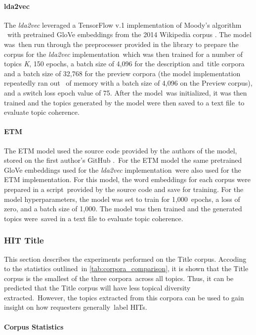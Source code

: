 \documentclass[letterpaper,12pt]{article}
\begin{document}
\paragraph{lda2vec}
The \emph{lda2vec} leveraged a TensorFlow v.1 implementation \cite{lda2vecTF} of Moody's algorithm \
with pretrained GloVe embeddings from the 2014 Wikipedia corpus \cite{pennington2014glove}. The model was\
then run through the preprocesser provided in the library to prepare the corpus for the \emph{lda2vec} implementation\
which was then trained for a number of topics \emph{K}, 150 epochs, a batch size of 4,096 for the description and\
title corpora and a batch size of 32,768 for the preview corpora (the model implementation repeatedly ran out \
of memory with a batch size of 4,096 on the Preview corpus), and a switch loss epoch value of 75. After the model\
was initialized, it was then trained and the topics generated by the model were then saved to a text file\
to evaluate topic coherence.

\paragraph{ETM}
The ETM model used the source code provided by the authors of the model, stored on the first author's GitHub \cite{etmGithub}.\
For the ETM model the same pretrained GloVe embeddings \cite{pennington2014glove} used for the \emph{lda2vec} implementation\
were also used for the ETM implementation. For this model, the word embeddings for each corpus were prepared in a script\
provided by the source code and save for training. For the model hyperparameters, the model was set to train for 1,000\
epochs, a loss of zero, and a batch size of 1,000. The model was then trained and the generated topics were\
saved in a text file to evaluate topic coherence.

\subsubsection{HIT Title}
This section describes the experiments performed on the Title corpus. Accoding to the statistics outlined\
in \ref{tab:corpora_comparison}, it is shown that the Title corpus is the smallest of the three corpora\
across all topics. Thus, it can be predicted that the Title corpus will have less topical diversity extracted.\
However, the topics extracted from this corpora can be used to gain insight on how requesters generally\
label HITs.
\paragraph{Corpus Statistics}
\end{document}
